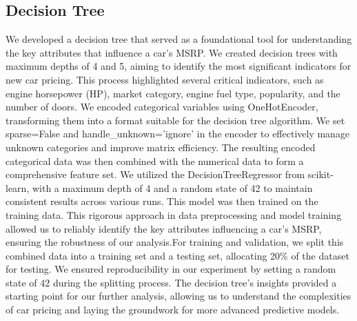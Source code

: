 \documentclass{article}
\begin{document}
\subsection{Decision Tree}
We developed a decision tree that served as a foundational tool for understanding the key attributes that influence a car's MSRP. We created decision trees with maximum depths of 4 and 5, aiming to identify the most significant indicators for new car pricing. This process highlighted several critical indicators, such as engine horsepower (HP), market category, engine fuel type, popularity, and the number of doors. We encoded categorical variables using OneHotEncoder, transforming them into a format suitable for the decision tree algorithm. We set sparse=False and handle\_unknown='ignore' in the encoder to effectively manage unknown categories and improve matrix efficiency. The resulting encoded categorical data was then combined with the numerical data to form a comprehensive feature set.
\newline
\newline
We utilized the DecisionTreeRegressor from scikit-learn, with a maximum depth of 4 and a random state of 42 to maintain consistent results across various runs. This model was then trained on the training data. This rigorous approach in data preprocessing and model training allowed us to reliably identify the key attributes influencing a car's MSRP, ensuring the robustness of our analysis.For training and validation, we split this combined data into a training set and a testing set, allocating 20\% of the dataset for testing. We ensured reproducibility in our experiment by setting a random state of 42 during the splitting process. \newline
The decision tree's insights provided a starting point for our further analysis, allowing us to understand the complexities of car pricing and laying the groundwork for more advanced predictive models.
\end{document}
